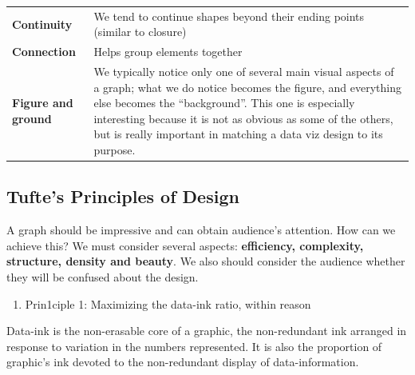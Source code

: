 \documentclass[]{book}
\providecommand{\tightlist}{%
  \setlength{\itemsep}{0pt}\setlength{\parskip}{0pt}}
\theoremstyle{definition}
\theoremstyle{definition}
\theoremstyle{definition}
\theoremstyle{remark}
\begin{document}
\begin{longtable}[]{@{}ll@{}}
\begin{minipage}[t]{0.16\columnwidth}\raggedright\strut
\textbf{Continuity}\strut
\end{minipage} & \begin{minipage}[t]{0.78\columnwidth}\raggedright\strut
We tend to continue shapes beyond their ending points (similar to
closure)\strut
\end{minipage}\tabularnewline
\begin{minipage}[t]{0.16\columnwidth}\raggedright\strut
\textbf{Connection}\strut
\end{minipage} & \begin{minipage}[t]{0.78\columnwidth}\raggedright\strut
Helps group elements together\strut
\end{minipage}\tabularnewline
\begin{minipage}[t]{0.16\columnwidth}\raggedright\strut
\textbf{Figure and ground}\strut
\end{minipage} & \begin{minipage}[t]{0.78\columnwidth}\raggedright\strut
We typically notice only one of several main visual aspects of a graph;
what we do notice becomes the figure, and everything else becomes the
``background''. This one is especially interesting because it is not as
obvious as some of the others, but is really important in matching a
data viz design to its purpose.\strut
\end{minipage}\tabularnewline
\bottomrule
\end{longtable}

\subsection{Tufte's Principles of
Design}\label{tuftes-principles-of-design}

A graph should be impressive and can obtain audience's attention. How
can we achieve this? We must consider several aspects:
\textbf{efficiency, complexity, structure, density and beauty}. We also
should consider the audience whether they will be confused about the
design.

\begin{enumerate}
\def\labelenumi{\arabic{enumi}.}
\tightlist
\item
  Prin1ciple 1: Maximizing the data-ink ratio, within reason
\end{enumerate}

Data-ink is the non-erasable core of a graphic, the non-redundant ink
arranged in response to variation in the numbers represented. It is also
the proportion of graphic's ink devoted to the non-redundant display of
data-information.
\end{document}
